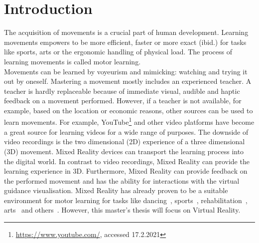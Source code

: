 \chapter{Introduction}
The acquisition of movements is a crucial part of human development\cite{mlbook}. Learning movements empowers to be more efficient, faster or more exact (ibid.) for tasks like sports, arts or the ergonomic handling of physical load. The process of learning movements is called motor learning.\\
Movements can be learned by voyeurism and mimicking: watching and trying it out by oneself. Mastering a movement mostly includes an experienced teacher. A teacher is hardly replaceable because of immediate visual, audible and haptic feedback on a movement performed. However, if a teacher is not available, for example, based on the location or economic reasons, other sources can be used to learn movements. For example, YouTube\footnote{\href{https://www.youtube.com/}{https://www.youtube.com/}, accessed 17.2.2021} and other video platforms have become a great source for learning videos for a wide range of purposes. The downside of video recordings is the two dimensional (2D) experience of a three dimensional (3D) movement. Mixed Reality devices can transport the learning process into the digital world. In contrast to video recordings, Mixed Reality can provide the learning experience in 3D. Furthermore, Mixed Reality can provide feedback on the performed movement and has the ability for interactions with the virtual guidance visualisation. Mixed Reality has already proven to be a suitable environment for motor learning for tasks like dancing~\cite{YouMove,vrdancetrainer,outsideme,performancetraining,mrdancetrainer}, sports~\cite{freethrowsimulator,trainingphysicalskills}, rehabilitation~\cite{motionma,physioathome,kinohaptics,sleevear,veimprovesml}, arts~\cite{ararm,justfollowme,stylo,elearningma,mythaichicoaches,rtgesturerecognistion,onebody,thaichichua} and others~\cite{tikl,lightguide}. However, this master's thesis will focus on Virtual Reality.\\
